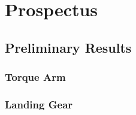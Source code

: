 %
%

\chapter{Prospectus}

\section{Preliminary Results}

\subsection{Torque Arm}

\subsection{Landing Gear}